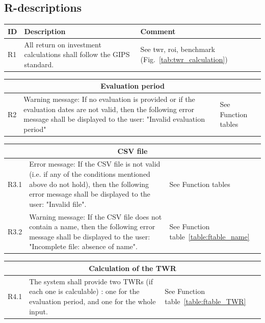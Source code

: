 \documentclass[runningheads,12pt]{article}
\begin{document}
\subsection{R-descriptions}

{\centering
\begin{longtable}{|l|p{9cm}|p{5cm}|}
\hline
\textbf{ID} & \textbf{Description} & \textbf{Comment}\\

\hline
R1 & All return on investment calculations shall follow the GIPS standard. & See twr, roi, benchmark (Fig.~\ref{tab:twr_calculation}) \\

\hline
\end{longtable}
\centering
\begin{longtable}{|l|p{9cm}|p{5cm}|}
\hline
\multicolumn{3}{|c|}{\textbf{Evaluation period}} \\

\hline
R2 &  Warning message: If no evaluation is provided or if the evaluation dates are not valid, then the following error message shall be displayed to the user: "Invalid evaluation period" & See Function tables \\

\hline
\end{longtable}
\centering
\begin{longtable}{|l|p{9cm}|p{5cm}|}

\hline
\multicolumn{3}{|c|}{\textbf{CSV file}} \\

\hline
R3.1 &  Error message: If the CSV file is not valid (i.e. if any of the conditions mentioned above do not hold), then the following error message shall be displayed to the user: "Invalid file". & See Function tables\\

\hline
R3.2 &  Warning message: If the CSV file does not contain a name, then the following error message shall be displayed to the user: "Incomplete file: absence of name". & See Function table~\ref{table:ftable_name}\\

\hline
\end{longtable}
\centering
\begin{longtable}{|l|p{9cm}|p{5cm}|}

\hline
\multicolumn{3}{|c|}{\textbf{Calculation of the TWR}} \\

\hline
R4.1 & The system shall provide two TWRs (if each one is calculable) : one for the evaluation period, and one for the whole input. & See Function table~\ref{table:ftable_TWR} \\


\end{longtable}}
\end{document}
